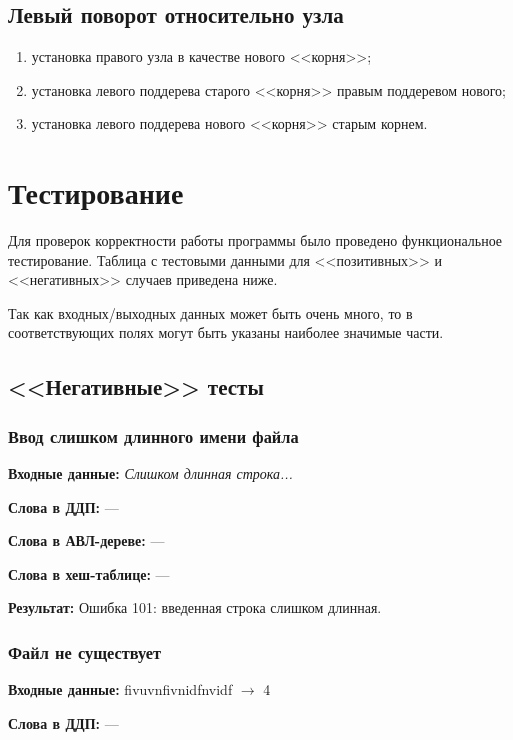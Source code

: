 \documentclass[a4paper,12pt]{extarticle}
\begin{document}
\subsection{Левый поворот относительно узла}
\begin{enumerate}
	\item установка правого узла в качестве нового <<корня>>;
	\item установка левого поддерева старого <<корня>> правым поддеревом нового;
	\item установка левого поддерева нового <<корня>> старым корнем.
\end{enumerate}

\newpage

\section{Тестирование}
Для проверок корректности работы программы было проведено функциональное тестирование. Таблица с тестовыми данными для <<позитивных>> и <<негативных>> случаев приведена ниже.

Так как входных/выходных данных может быть очень много, то в соответствующих полях могут быть указаны наиболее значимые части.

\subsection{<<Негативные>> тесты}
\subsubsection{Ввод слишком длинного имени файла}

\textbf{Входные данные: }
\textit{Слишком длинная строка...}

\textbf{Слова в ДДП: }
---

\textbf{Слова в АВЛ-дереве: }
---

\textbf{Слова в хеш-таблице: }
---

\textbf{Результат: }
Ошибка 101: введенная строка слишком длинная.


\subsubsection{Файл не существует}

\textbf{Входные данные: }
fivuvnfivnidfnvidf $\rightarrow$ 4

\textbf{Слова в ДДП: }
---
\end{document}

